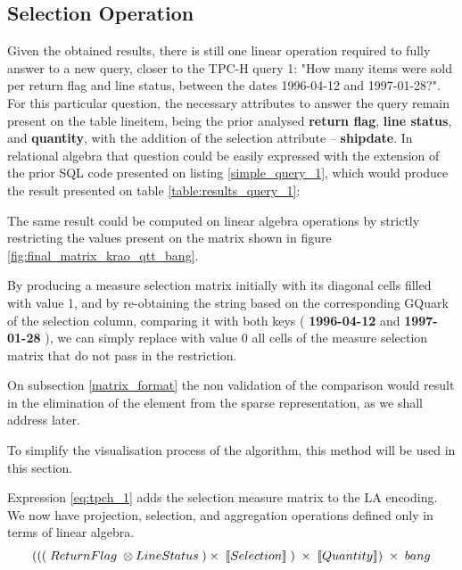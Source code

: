 \subsection{Selection Operation}
Given the obtained results, there is still one linear operation required to fully answer to a new query,  closer to the TPC-H query 1: "How many items were sold per return flag and line status, between the dates 
1996-04-12 and 1997-01-28?". For this particular question, the necessary attributes to answer the query remain present on the table lineitem, being the prior analysed \textbf{return flag}, \textbf{line status}, and \textbf{quantity}, with the addition of the selection attribute -- \textbf{shipdate}. In relational algebra that question could be easily expressed with the extension of the prior SQL code presented on listing \ref{simple_query_1}, which would produce the result presented on table \ref{table:results_query_1}:




The same result could be computed on linear algebra operations by strictly restricting the values present on the matrix shown in figure \ref{fig:final_matrix_krao_qtt_bang}. 

By producing a measure selection matrix initially with its diagonal cells filled with  value 1, and by re-obtaining the string based on the corresponding GQuark of the selection column, comparing it with both keys ( \textbf{1996-04-12} and \textbf{1997-01-28} ), we can simply replace with value 0 all cells of the measure selection matrix that do not pass in the restriction.\par 
 On subsection \ref{matrix_format} the non validation of the comparison would result in the elimination of the element from the sparse representation, as we shall address later. 
 
 To simplify the visualisation process of the algorithm, this method will be used in this section.\par 
Expression \ref{eq:tpch_1} adds the selection measure matrix to the LA encoding. We now have projection, selection, and aggregation operations defined only in terms of linear algebra.
\begin{equation}
\centering
\scriptsize
( ( (\ ReturnFlag\ \otimes LineStatus\ ) \times\ \llbracket Selection \rrbracket\ )\ \times\ \llbracket Quantity \rrbracket )\ \times\ bang
\label{eq:tpch_1}
\end{equation}


